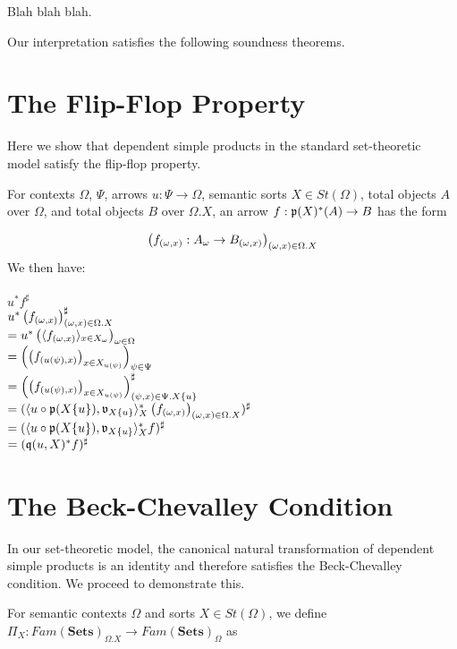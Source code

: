 \documentclass[sigplan,10pt,review,anonymous]{acmart}
\newcommand{\mbf}[1]{\mathbf{#1}}
\newcommand{\fm}[2]{
\left(
\tiny
#1
\normalsize
\right)_{#2}
}
\begin{document}
Blah blah blah.

Our interpretation satisfies the following soundness theorems.


\appendix

\onecolumn

\section{The Flip-Flop Property}

Here we show that dependent simple products in the standard set-theoretic model satisfy the flip-flop property.

For contexts $\Omega$, $\Psi$, arrows $u : \Psi \to \Omega$, semantic sorts $X \in \mathit{St}(\Omega)$, total objects $A$ over $\Omega$, and total objects $B$ over $\Omega . X$,  
an arrow $f : \frak p(X)^*(A) \to B$ has the form

$$\fm{f_{(\omega,x)} : A_{\omega} \to B_{(\omega,x)}}{(\omega,x) \in \Omega . X}$$
We then have:\\~\\
$u^* f^\sharp$ \\
$u^* \fm{f_{(\omega,x)}}{(\omega,x) \in \Omega . X}^\sharp$ \\
$= u^* \fm{\langle f_{(\omega, x)} \rangle_{x \in X_\omega}}{\omega \in \Omega}$ \\
$= \fm{ \fm{f_{(u(\psi), x)}}{x \in X_{u(\psi)}}}{\psi \in \Psi}$\\
$= \fm{ \fm{f_{(u(\psi), x)}}{x \in X_{u(\psi)}}}{(\psi, x) \in \Psi . X \{ u \}}^\sharp$\\
$= (\langle u \circ \frak p(X \{ u \}), \frak v_{X \{ u \}} \rangle_X^* \fm{f_{(\omega,x)}}{(\omega,x) \in \Omega . X})^\sharp$\\
$= (\langle u \circ \frak p(X \{ u \}), \frak v_{X \{ u \}} \rangle_X^* f)^\sharp$\\
$= (\frak q(u,X)^* f)^\sharp$

\section{The Beck-Chevalley Condition}

\label{sec:beck-chevalley}

In our set-theoretic model, the canonical natural transformation of dependent simple products is an identity and therefore satisfies the Beck-Chevalley condition. We proceed to demonstrate this.

For semantic contexts $\Omega$ and sorts $X \in \mathit{St}(\Omega)$, we define $\Pi_{X} : \mathit{Fam}(\mbf{Sets})_{\Omega . X} \to \mathit{Fam}(\mbf{Sets})_{\Omega}$ as
\end{document}
